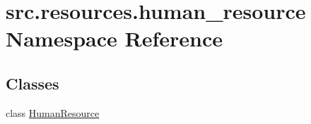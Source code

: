 \hypertarget{namespacesrc_1_1resources_1_1human__resource}{\section{src.\+resources.\+human\+\_\+resource Namespace Reference}
\label{namespacesrc_1_1resources_1_1human__resource}
}
\subsection*{Classes}
\begin{DoxyCompactItemize}
\item 
class \hyperlink{classsrc_1_1resources_1_1human__resource_1_1_human_resource}{Human\+Resource}
\end{DoxyCompactItemize}
